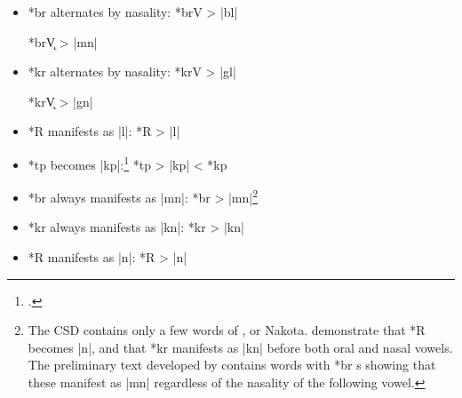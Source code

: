 \documentclass[output=paper]{LSP/langsci}
\begin{document}

\begin{itemize}
\item  *br alternates by nasality:  \hspace{1em} *brV	>	|bl|

\hspace{12em} *br\k{V}	>	|mn|

\item  *kr alternates by nasality: \hspace{1em}   *krV       >          |gl|

\hspace{12em} *kr\k{V}	>	|gn|
\item *R manifests as |l|: \hspace{4.5em} *R	>	|l|
\item *tp becomes |kp|:\footnote{\citealt[253, 265, 865]{Rankinetal2006PDF}.} \hspace{4.5em} *tp	>	|kp|	 <	*kp
 \end{itemize}
 
 
 \begin{itemize}
 \item  *br always manifests as |mn|:     \hspace{1.5em}  *br       >          |mn|\footnote{The CSD contains only a few words of , or Nakota.  \citet{ParksDeMallie1992} demonstrate that *R becomes |n|, and that *kr manifests as |kn| before both oral and nasal vowels.  The preliminary  text developed by \citet{Shields2012} contains words with *br s showing that these manifest as |mn| regardless of the nasality of the following vowel.}
 \item *kr always manifests as |kn|:       \hspace{1.6em}        *kr       >          |kn|
 \item *R manifests as |n|: \hspace{5.3em} *R	>	|n|
 \end{itemize}
  
 
\end{document}
